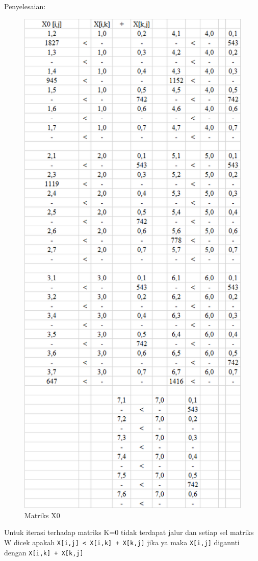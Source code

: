 \begin{enumerate}
\begin{enumerate}
\begin{enumerate}
            \par Penyelesaian:
            \begin{figure}[h]
            \centering
            \includegraphics[scale=0.34]{figures/ALGORITMA/MATRIKSX0.png}
            \caption{Matriks X0}
            \label{gambar31}
            \end{figure}
            \par Untuk iterasi terhadap matriks K=0 tidak terdapat jalur dan setiap sel matriks W dicek apakah \verb|X[i,j] < X[i,k] + X[k,j]| jika ya maka \verb|X[i,j]| digannti dengan \verb|X[i,k] + X[k,j]|



\end{enumerate}
\end{enumerate}
\end{enumerate}
